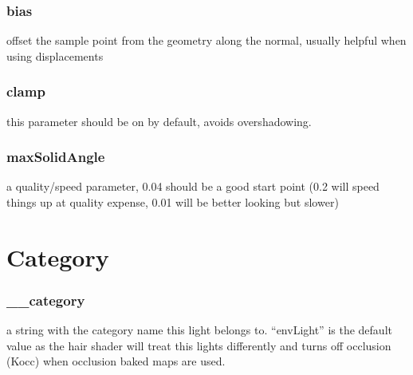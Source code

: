 \documentclass[final,letterpaper,twoside,12pt]{report}
\begin{document}
\subsubsection {bias}
offset the sample point from the geometry along the normal, usually helpful when using displacements
\smallskip
\subsubsection {clamp}
this parameter should be on by default, avoids overshadowing.
\smallskip
\subsubsection {maxSolidAngle}
a quality/speed parameter, 0.04 should be a good start point (0.2 will speed things up at quality expense, 0.01 will be better looking but slower)
\smallskip

\section {Category}
\subsubsection {\_\_category}
a string with the category name this light belongs to. “envLight”  is the default value as the hair shader will treat this lights differently and turns off occlusion (Kocc) when occlusion baked maps are used.
\smallskip
\end{document}
